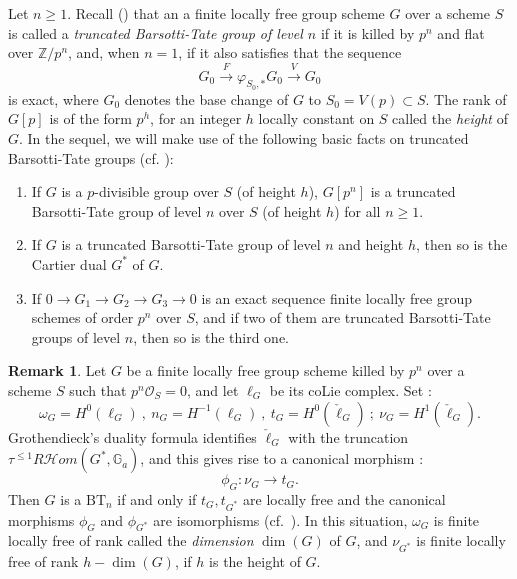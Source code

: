 \documentclass{amsart}
\theoremstyle{plain}
\theoremstyle{definition}
\newtheorem{remark}[theorem]{Remark}
\newcommand{\Z}{\mathbb{Z}}
\newcommand{\red}[1]{{\color{black} #1}}
\begin{document}
\red{Let $n\geq 1$. Recall (\cite[Definition 1.1]{illusie_deformations_de_groupes_de_barsotti_tate}) that an a finite locally free group scheme $G$ over a scheme $S$ is called a \textit{truncated Barsotti-Tate group of level $n$} if it is killed by $p^n$ and flat over $\Z/p^n$, and, when $n=1$, if it also satisfies that the sequence
$$
G_0 \overset{F} \to \varphi_{S_0,\ast} G_0 \overset{V} \to G_0
$$
is exact, where $G_0$ denotes the base change of $G$ to $S_0=V(p) \subset S$. The rank of $G[p]$ is of the form $p^h$, for an integer $h$ locally constant on $S$ called the \textit{height} of $G$. In the sequel, we will make use of the following basic facts on truncated Barsotti-Tate groups (cf. \cite[1.3 (e), 1.3 (f), 1.6]{illusie_deformations_de_groupes_de_barsotti_tate}):
\begin{enumerate}
\item If $G$ is a $p$-divisible group over $S$ (of height $h$), $G[p^n]$ is a truncated Barsotti-Tate group of level $n$ over $S$ (of height $h$) for all $n\geq 1$.
\item If $G$ is a truncated Barsotti-Tate group of level $n$ and height $h$, then so is the Cartier dual $G^\ast$ of $G$.
\item If $0 \to G_1 \to G_2 \to G_3 \to 0$ is an exact sequence finite locally free group schemes of order $p^n$ over $S$, and if two of them are truncated Barsotti-Tate groups of level $n$, then so is the third one.
\end{enumerate}
}





\begin{remark}
  \label{remark-statement-about-truncated-bt}
Let $G$ be a finite locally free group scheme \red{killed by $p^n$ over a scheme $S$ such that $p^n \mathcal{O}_S=0$}, and let $\ell_G$ be its coLie complex. Set :
\[ \omega_G=H^0(\ell_G) ~ , ~ n_G=H^{-1}(\ell_G) ~ , ~ t_G=H^0(\check{\ell}_G) ~ ; ~ \nu_G=H^1(\check{\ell}_G). \]
Grothendieck's duality formula identifies $\check{\ell}_G$ with the truncation $\tau^{\leq 1}R\mathcal{H}om(G^*,\mathbb{G}_a)$, and this gives rise to a canonical morphism :
\[ \phi_G :  \nu_G \to t_G.\]
Then $G$ is a $\mathrm{BT}_n$ if and only if $t_G, t_{G^*}$ are locally free and the canonical morphisms $\phi_G$ and $\phi_{G^*}$ are isomorphisms (cf.\ \cite[Corollary 2.2.5]{illusie_deformations_de_groupes_de_barsotti_tate}). \red{In this situation, $\omega_G$ is finite locally free of rank called the \textit{dimension} $\dim(G)$ of $G$, and $\nu_{G^\ast}$ is finite locally free of rank $h-\dim(G)$, if $h$ is the height of $G$.} 
\end{remark}
\end{document}
